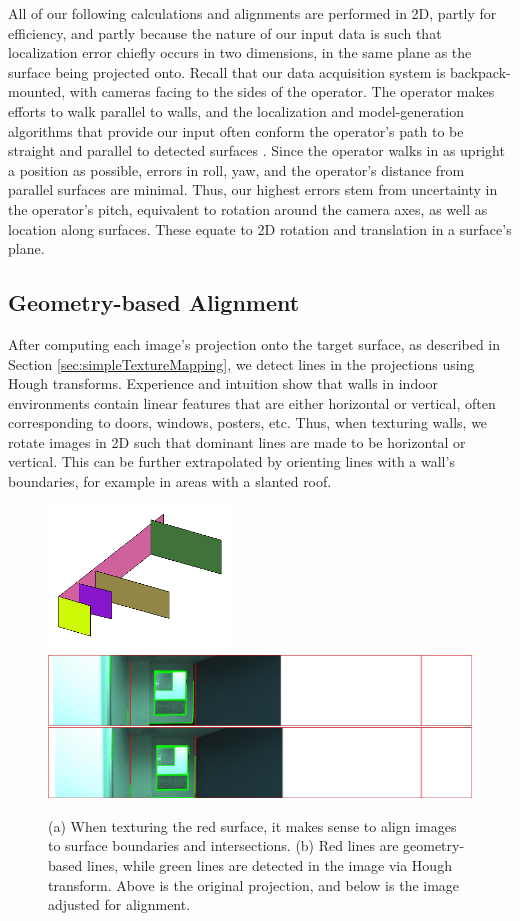 \documentclass[]{spie}  %
\begin{document}
All of our following calculations and alignments are performed in 2D,
partly for efficiency, and partly because the nature of our input data
is such that localization error chiefly occurs in two dimensions, in
the same plane as the surface being projected onto. Recall that our
data acquisition system is backpack-mounted, with cameras facing to
the sides of the operator. The operator makes efforts to walk parallel
to walls, and the localization and model-generation algorithms that
provide our input often conform the operator's path to be straight and
parallel to detected surfaces \cite{kua2012loopclosure,
  sanchez2012point}. Since the operator walks in as upright a position
as possible, errors in roll, yaw, and the operator's distance from
parallel surfaces are minimal. Thus, our highest errors stem from
uncertainty in the operator's pitch, equivalent to rotation around the
camera axes, as well as location along surfaces. These equate to 2D
rotation and translation in a surface's plane.

\subsection{Geometry-based Alignment}
\label{sec:geometryAlignment}
After computing each image's projection onto the target surface, as
described in Section \ref{sec:simpleTextureMapping}, we detect lines
in the projections using Hough transforms. Experience and intuition
show that walls in indoor environments contain linear features that
are either horizontal or vertical, often corresponding to doors,
windows, posters, etc. Thus, when texturing walls, we rotate images in
2D such that dominant lines are made to be horizontal or
vertical. This can be further extrapolated by orienting lines with a
wall's boundaries, for example in areas with a slanted roof.

\begin{figure}
  \centering
  \includegraphics[height=1.5in]{geometryAlign_planes.png}
  \includegraphics[height=1.5in]{geometryAlignment.jpg}
  \caption{(a) When texturing the red surface, it makes sense to align images to surface boundaries and intersections. (b) Red lines are geometry-based lines, while green lines are detected in the image via Hough transform. Above is the original projection, and below is the image adjusted for alignment.}
  \label{fig:geometryAlignment}
\end{figure}
\end{document}
